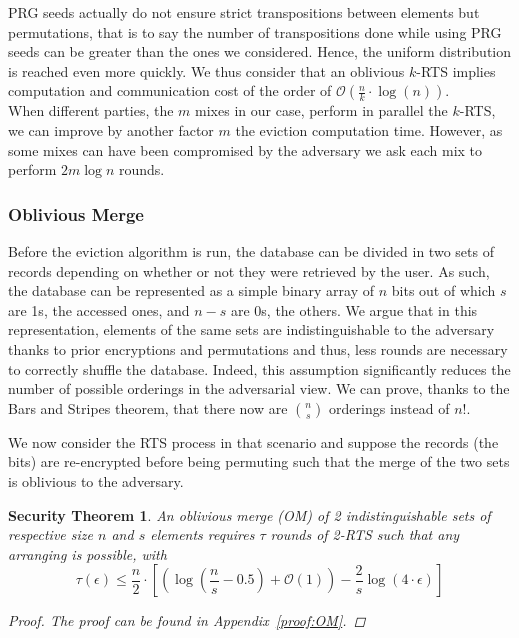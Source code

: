 \documentclass{llncs}
\newtheorem{secthm}{Security Theorem}
\begin{document}
PRG seeds actually do not ensure strict transpositions between elements but permutations, that is to say the number of transpositions done while using PRG seeds can be greater than the ones we considered. Hence, the uniform distribution is reached even more quickly. We thus consider that an oblivious $k$-RTS implies computation and communication cost of the order of $\mathcal{O} \left(\frac{n}{k}\cdot \log(n)\right)$.\\

When different parties, the $m$ mixes in our case, perform in parallel the $k$-RTS, we can improve by another factor $m$ the eviction computation time. However, as some mixes can have been compromised by the adversary we ask each mix to perform $2 m\log n$ rounds.

%
\subsubsection{Oblivious Merge}\label{OM}
Before the eviction algorithm is run, the database can be divided in two sets of records depending on whether or not they were retrieved by the user. As such, the database can be represented as a simple binary array of $n$ bits out of which $s$ are 1s, the accessed ones, and $n-s$ are 0s, the others.
We argue that in this representation, elements of the same sets are indistinguishable to the adversary thanks to prior encryptions and permutations and thus, less rounds are necessary to correctly shuffle the database.
Indeed, this assumption significantly reduces the number of possible orderings in the adversarial view. We can prove, thanks to the Bars and Stripes theorem, that there now are ${n \choose s}$ orderings instead of $n!$.

We now consider the RTS process in that scenario and suppose the records (the bits) are re-encrypted before being permuting such that the merge of the two sets is oblivious to the adversary.

\begin{secthm}
An oblivious merge (OM) of 2 indistinguishable sets of respective size $n$ and $s$ elements requires $\tau$ rounds of 2-RTS such that any arranging is possible, with
$$\tau(\epsilon) \leq \frac{n}{2}  \cdot \left [ \left( \log \left (\frac{n}{s}-0.5\right) +\mathcal{O}\left(1\right) \right ) - \frac{2}{s} \log \left( 4 \cdot \epsilon\right) \right ] $$%
\begin{proof}
The proof can be found in Appendix~\ref{proof:OM}.
\end{proof}
\end{secthm}
\end{document}
